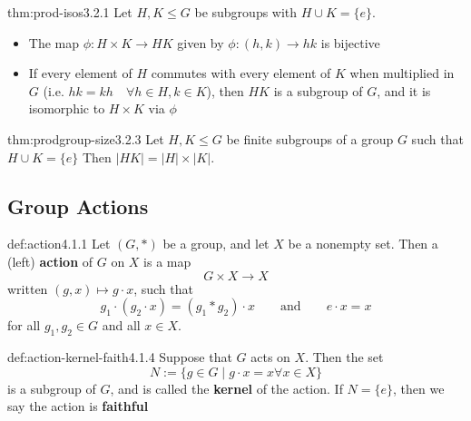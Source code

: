 \documentclass[landscape, 8pt]{extarticle}
\begin{document}
\begin{multicols}{3}
\begin{thm}{thm:prod-isos}{3.2.1}
Let $H,K\le G$ be subgroups with $H\cup K = \{e\}$.
\renewcommand\labelitemi{\tiny$\bullet$}
\begin{itemize}
    \setlength\itemsep{0em}
    \item The map $\phi:H\times K\to HK$ given by $\phi:(h,k)\to hk$ is bijective
    \item If every element of $H$ commutes with every element of $K$ when multiplied in $G$ (i.e. $hk=kh\quad \forall h\in H, k\in K$), then $HK$ is a subgroup of $G$, and it is isomorphic to $H\times K$ via $\phi$
\end{itemize}
\end{thm}
\vspace{-5pt}

\begin{thm}{thm:prodgroup-size}{3.2.3}
Let $H,K\le G$ be finite subgroups of a group $G$ such that $H\cup K = \{e\}$ Then $\lvert HK\rvert =\lvert H\rvert \times \lvert K\rvert $.
\end{thm}
\vspace{-5pt}


\subsection*{Group Actions}

\begin{dfn}{def:action}{4.1.1}
    Let $(G,*)$ be a group, and let $X$ be a nonempty set. Then a (left) \textbf{action} of $G$ on $X$ is a map
    \[G\times X\to X\]
    written $(g,x)\mapsto g\cdot x$, such that
    \[g_{1}\cdot(g_{2}\cdot x) = (g_{1} * g_{2}) \cdot x \qquad \text{and} \qquad e\cdot x = x \]
    for all $g_{1},g_{2}\in G$ and all $x\in X$.
\end{dfn}
\vspace{-5pt}

\begin{dfn}{def:action-kernel-faith}{4.1.4}
Suppose that $G$ acts on $X$. Then the set
\[N := \{g\in G\mid g\cdot x=x \forall x\in X\}\]
is a subgroup of $G$, and is called the \textbf{kernel} of the action. If $N = \{e\}$, then we say the action is \textbf{faithful}
\end{dfn}
\vspace{-5pt}


\end{multicols}
\end{document}
